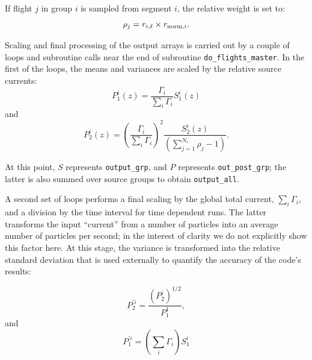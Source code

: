 \documentclass[12pt]{report}
\begin{document}
If flight $j$ in group $i$ is sampled from 
segment $i$, the relative weight
is set to:
\begin{equation}
  \rho_{j} = r_{i, \ell} \times r_{{\rm norm}, i}.
\label{statwt}
\end{equation}

Scaling and final processing of the output arrays
is carried out by a couple of loops and subroutine
calls near the end of subroutine 
{\tt do\_flights\_master}.  In the first of the loops,
the means and variances are scaled by the relative
source currents:
\begin{equation}
P_{1}^{i}(z) = \frac{\Gamma_{i}}{\sum_{i} \Gamma_{i}} S_{1}^{i}(z)
\label{scaledmean}
\end{equation}
and
\begin{equation}
P_{2}^{i}(z) = \left( \frac{\Gamma_{i}}{\sum_{i} \Gamma_{i}} \right)^{2}
\frac{S_{2}^{i}(z)}{\left( \sum_{j = 1}^{N_{i}} \rho_{j} - 1 \right)}.
\label{scaledvar}
\end{equation}

At this point, $S$ represents {\tt output\_grp}, and $P$
represents {\tt out\_post\_grp}; the latter is also summed
over source groups to obtain {\tt output\_all}.

A second set of loops performs a final scaling
by the global total current, $\sum_{i} \Gamma_{i}$,
and a division by the time
interval  for time dependent runs.  The latter transforms the input
``current'' from a number of particles into an
average number of particles per second; in the interest
of clarity we do not explicitly show this factor
here.  At this stage, the variance is transformed
into the relative standard deviation that is used
externally to quantify the accuracy of the code's
results:

\begin{equation}
P_{2}^{\prime i} = \frac{( P_{2}^{i} )^{1/2}}{P_{1}^{1}},
\label{finalrsd}
\end{equation}
and 
\begin{equation}
P_{1}^{\prime i} = (\sum_{i} \Gamma_{i}) S_{1}^{i}
\label{finalmean}
\end{equation}



\end{document}
